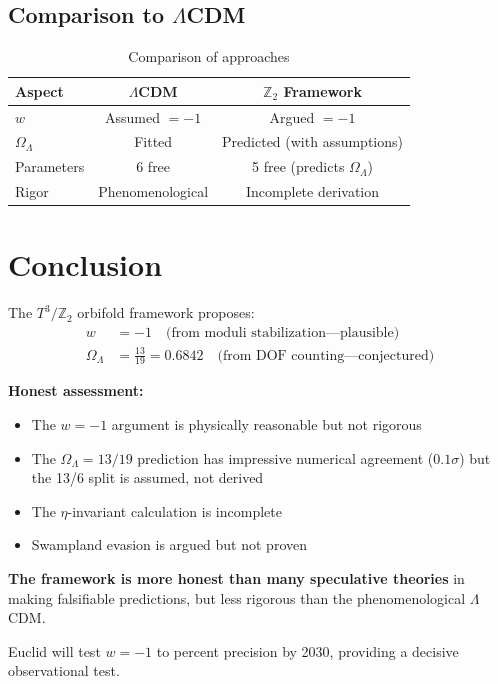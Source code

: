 \documentclass[12pt,a4paper]{article}
\begin{document}
\subsection{Comparison to $\Lambda$CDM}

\begin{table}[h]
\centering
\begin{tabular}{lcc}
\toprule
Aspect & $\Lambda$CDM & $\mathbb{Z}_2$ Framework \\
\midrule
$w$ & Assumed $= -1$ & Argued $= -1$ \\
$\Omega_\Lambda$ & Fitted & Predicted (with assumptions) \\
Parameters & 6 free & 5 free (predicts $\Omega_\Lambda$) \\
Rigor & Phenomenological & Incomplete derivation \\
\bottomrule
\end{tabular}
\caption{Comparison of approaches}
\end{table}

\section{Conclusion}

The $T^3/\mathbb{Z}_2$ orbifold framework proposes:
\begin{align}
w &= -1 \quad \text{(from moduli stabilization---plausible)} \\
\Omega_\Lambda &= \frac{13}{19} = 0.6842 \quad \text{(from DOF counting---conjectured)}
\end{align}

\textbf{Honest assessment:}
\begin{itemize}
    \item The $w = -1$ argument is physically reasonable but not rigorous
    \item The $\Omega_\Lambda = 13/19$ prediction has impressive numerical agreement ($0.1\sigma$) but the 13/6 split is assumed, not derived
    \item The $\eta$-invariant calculation is incomplete
    \item Swampland evasion is argued but not proven
\end{itemize}

\textbf{The framework is more honest than many speculative theories} in making falsifiable predictions, but less rigorous than the phenomenological $\Lambda$CDM.

Euclid will test $w = -1$ to percent precision by 2030, providing a decisive observational test.
\end{document}
